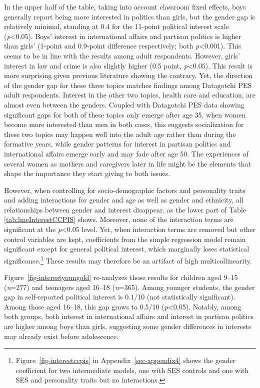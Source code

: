\documentclass[
  letterpaper,
  DIV=11,
  numbers=noendperiod]{scrreprt}
\begin{document}
In the upper half of the table, taking into account classroom fixed
effects, boys generally report being more interested in politics than
girls, but the gender gap is relatively minimal, standing at 0.4 for the
11-point political interest scale (\emph{p}\textless0.05). Boys'
interest in international affairs and partisan politics is higher than
girls' (1-point and 0.9-point difference respectively; both
\emph{p}\textless0.001). This seems to be in line with the results among
adult respondents. However, girls' interest in law and crime is also
slightly higher (0.5 point, \emph{p}\textless0.05). This result is more
surprising given previous literature showing the contrary. Yet, the
direction of the gender gap for these three topics matches findings
among Datagotchi PES adult respondents. Interest in the other two
topics, health care and education, are almost even between the genders.
Coupled with Datagotchi PES data showing significant gaps for both of
these topics only emerge after age 35, when women become more interested
than men in both cases, this suggests socialization for these two topics
may happen well into the adult age rather than during the formative
years, while gender patterns for interest in partisan politics and
international affairs emerge early and may fade after age 50. The
experiences of several women as mothers and caregivers later in life
might be the elements that shape the importance they start giving to
both issues.

However, when controlling for socio-demographic factors and personality
traits and adding interactions for gender and age as well as gender and
ethnicity, all relationships between gender and interest disappear, as
the lower part of Table \ref{tab:lmeInterestCCPIS} shows. Moreover, none
of the interaction terms are significant at the \emph{p}\textless0.05
level. Yet, when interaction terms are removed but other control
variables are kept, coefficients from the simple regression model remain
significant except for general political interest, which marginally
loses statistical significance.\footnote{Figure~\ref{fig-interestccpis}
  in Appendix~\ref{sec-appendix4} shows the gender coefficient for two
  intermediate models, one with SES controls and one with SES and
  personality traits but no interactions.} These results may therefore
be an artifact of high multicollinearity.

Figure~\ref{fig-interestyoungold} re-analyzes those results for children
aged 9--15 (\emph{n}=277) and teenagers aged 16--18 (\emph{n}=365).
Among younger students, the gender gap in self-reported political
interest is 0.1/10 (not statistically significant). Among those aged
16--18, this gap grows to 0.5/10 (\emph{p}\textless0.05). Notably, among
both groups, both interest in international affairs and interest in
partisan politics are higher among boys than girls, suggesting some
gender differences in interests may already exist before adolescence.
\end{document}
